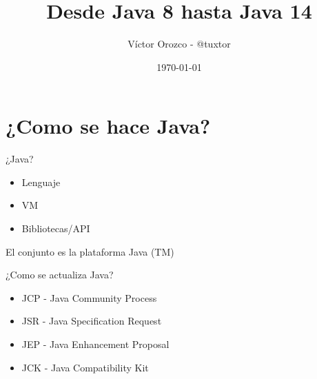 \documentclass[aspectratio=169]{beamer}
\title{Desde Java 8 hasta Java 14}
\author{Víctor Orozco - @tuxtor}
\institute{Nabenik}
\date{\today}
\begin{document}
{
    \frame{\titlepage}
}


\begin{frame}
    \tableofcontents
\end{frame}


\section{¿Como se hace Java?}

\begin{frame}[fragile]{¿Java?}
	\begin{itemize}
		\item Lenguaje
		\item VM
		\item Bibliotecas/API
	\end{itemize}

El conjunto es la plataforma Java (TM)
	
\end{frame}

\begin{frame}[fragile]{¿Como se actualiza Java?}
	\begin{itemize}
		\item JCP - Java Community Process
		\item JSR - Java Specification Request
		\item JEP - Java Enhancement Proposal
		\item JCK - Java Compatibility Kit
	\end{itemize}	
\end{frame}
\end{document}
